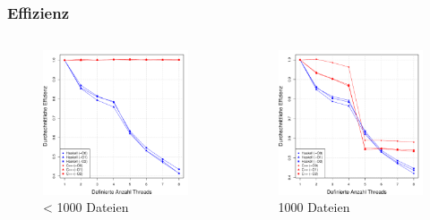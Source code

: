 \documentclass[presentation, shownotes]{beamer}
\begin{document}
\begin{frame}
\frametitle{Effizienz}
\begin{columns}[c]
    \begin{figure}
        \includegraphics[width=\textwidth]{efficiency_sub1000_desktop.pdf}
        \caption{< 1000 Dateien}
    \end{figure}

    \begin{figure}
        \includegraphics[width=\textwidth]{efficiency_1000_desktop.pdf}
        \caption{1000 Dateien}
    \end{figure}
\end{columns}
\end{frame}
\end{document}
